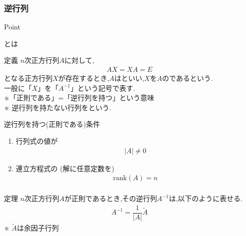 \documentclass[a4paper]{jsarticle}
\begin{document}
\subsubsection{逆行列}
\begin{itembox}[l]{Point}
    \begin{center}
        とは
    \end{center}
\end{itembox}
\begin{itembox}[l]{定義}
    $n$次正方行列$A$に対して,
    \begin{eqnarray*}
        AX=XA=E
    \end{eqnarray*}
    となる正方行列$X$が存在するとき,$A$はといい,$X$を$A$のであるという.\\
    一般に「$X$」を「$A^{-1}$」という記号で表す.\\
    ※「正則である」=「逆行列を持つ」という意味\\
    ※ 逆行列を持たない行列をという.
\end{itembox}
\begin{itembox}[l]{逆行列を持つ(正則である)条件}
    \begin{enumerate}[(1)]
        \item 行列式の値が
              \begin{eqnarray*}
                  \left|A\right|\neq0
              \end{eqnarray*}
        \item 連立方程式の (解に任意定数を)
              \begin{eqnarray*}
                  \mathrm{rank}\left(A\right)=n\\
              \end{eqnarray*}
    \end{enumerate}
\end{itembox}
\begin{itembox}[l]{定理}
    $n$次正方行列$A$が正則であるとき,その逆行列$A^{-1}$は,以下のように表せる.
    \begin{eqnarray*}
        A^{-1}=\dfrac{1}{|A|}\tilde{A}
    \end{eqnarray*}
    ※ $\tilde{A}$は余因子行列
\end{itembox}
\\
\end{document}
